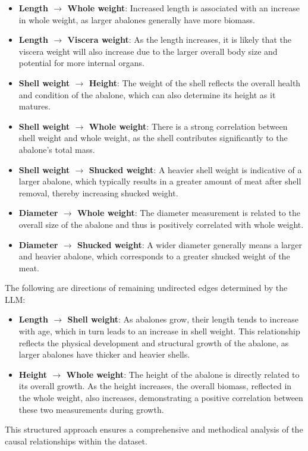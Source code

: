 \documentclass{article}
\begin{document}
\begin{minipage}[t]{0.6\linewidth}
\begin{itemize}
\item \textbf{Length $\rightarrow$ Whole weight}: Increased length is associated with an increase in whole weight, as larger abalones generally have more biomass.
                
\item \textbf{Length $\rightarrow$ Viscera weight}: As the length increases, it is likely that the viscera weight will also increase due to the larger overall body size and potential for more internal organs.
                
\item \textbf{Shell weight $\rightarrow$ Height}: The weight of the shell reflects the overall health and condition of the abalone, which can also determine its height as it matures.
                
\item \textbf{Shell weight $\rightarrow$ Whole weight}: There is a strong correlation between shell weight and whole weight, as the shell contributes significantly to the abalone's total mass.
                
\item \textbf{Shell weight $\rightarrow$ Shucked weight}: A heavier shell weight is indicative of a larger abalone, which typically results in a greater amount of meat after shell removal, thereby increasing shucked weight.
                
\item \textbf{Diameter $\rightarrow$ Whole weight}: The diameter measurement is related to the overall size of the abalone and thus is positively correlated with whole weight.
                
\item \textbf{Diameter $\rightarrow$ Shucked weight}: A wider diameter generally means a larger and heavier abalone, which corresponds to a greater shucked weight of the meat.
\end{itemize}
            
The following are directions of remaining undirected edges determined by the LLM:
\begin{itemize}
\item \textbf{Length $\rightarrow$ Shell weight}: As abalones grow, their length tends to increase with age, which in turn leads to an increase in shell weight. This relationship reflects the physical development and structural growth of the abalone, as larger abalones have thicker and heavier shells.

\item \textbf{Height $\rightarrow$ Whole weight}: The height of the abalone is directly related to its overall growth. As the height increases, the overall biomass, reflected in the whole weight, also increases, demonstrating a positive correlation between these two measurements during growth.
\end{itemize}
        
This structured approach ensures a comprehensive and methodical analysis of the causal relationships within the dataset.
        
\vfill
\end{minipage}
\end{document}
